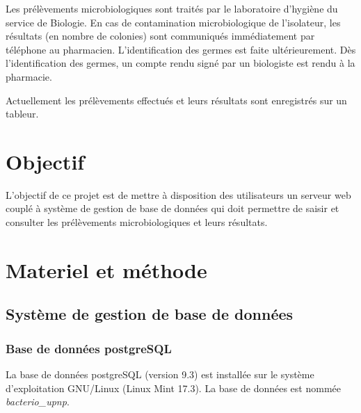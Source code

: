 \documentclass[12pt,a4paper,oneside]{article}
\begin{document}
Les prélèvements microbiologiques sont traités par le laboratoire d'hygiène du service de Biologie. En cas de contamination microbiologique de l'isolateur, les résultats (en nombre de colonies) sont communiqués immédiatement par téléphone au pharmacien. L'identification des germes est faite ultérieurement. Dès l'identification des germes, un compte rendu signé par un biologiste est rendu à la pharmacie.

Actuellement les prélèvements effectués et leurs résultats sont enregistrés sur un tableur.
\section{Objectif}
L'objectif de ce projet est de mettre à disposition des utilisateurs un serveur web couplé à système de gestion de base de données qui doit permettre de saisir et consulter les prélèvements microbiologiques et leurs résultats.
\section{Materiel et méthode}

\subsection{Système de gestion de base de données}
 \subsubsection{Base de données postgreSQL}

La base de données postgreSQL (version 9.3) est installée sur le système d'exploitation GNU/Linux (Linux Mint 17.3).
La base de données est nommée \emph{bacterio\_upnp}.
\end{document}

